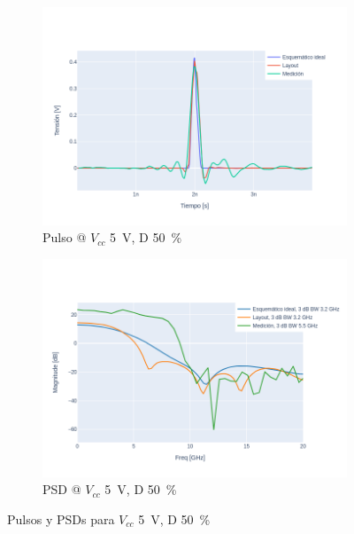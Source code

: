 \begin{figure}[t!]
    \centering
    \begin{subfigure}[b]{0.49\textwidth}
        \centering
        \includegraphics[width=\textwidth]{images/plots/Vcc_5V_duty_50_time_domain.png}
        \caption{Pulso @ $V_{cc}$ \qty{5}{\volt}, D \qty{50}{\percent} }
        \label{fig:pulses_5v_50}
    \end{subfigure}
    \hfill
    \begin{subfigure}[b]{0.49\textwidth}
        \centering
        \includegraphics[width=\textwidth]{images/plots/Vcc_5V_duty_50_psd.png}
        \caption{PSD @ $V_{cc}$ \qty{5}{\volt}, D \qty{50}{\percent} }
        \label{fig:psd_5v_50}
    \end{subfigure}
    \caption{Pulsos y PSDs para $V_{cc}$ \qty{5}{\volt}, D \qty{50}{\percent} }
    \label{fig:plots_5v_50}
\end{figure}

